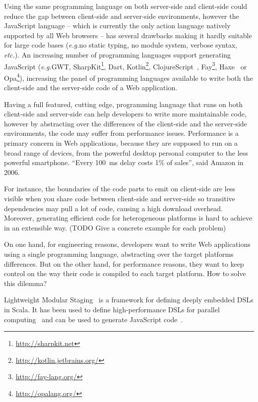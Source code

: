 \documentclass[preprint]{sigplanconf}
\newcommand{\eg}{\emph{e.g.}}
\newcommand{\etc}{\emph{etc.}}
\begin{document}
Using the same programming language on both server-side and client-side could reduce the gap between client-side and
server-side environments, however the JavaScript language -- which is currently the only action language natively
supported by all Web browsers -- has several drawbacks making it hardly suitable for large code bases (\eg no static
typing, no module system, verbose syntax, \etc). An increasing number of programming languages support generating
JavaScript (\eg GWT, SharpKit\footnote{\href{http://sharpkit.net}{http://sharpkit.net}}, Dart,
Kotlin\footnote{\href{http://kotlin.jetbrains.org/}{http://kotlin.jetbrains.org/}},
ClojureScript~\cite{McGranaghan11_ClojureScript}, Fay\footnote{\href{http://fay-lang.org/}{http://fay-lang.org/}},
Haxe~\cite{Cannasse08_HaXe} or Opa\footnote{\href{http://opalang.org/}{http://opalang.org/}}), increasing the panel
of programming languages available to write both the client-side and the server-side code of a Web application.

Having a full featured, cutting edge, programming language that runs on both client-side and server-side can help
developers to write more maintainable code, however by abstracting over the differences of the client-side and the
server-side environments, the code may suffer from performance issues. Performance is a primary concern in Web
applications, because they are supposed to run on a broad range of devices, from the powerful desktop personal
computer to the less powerful smartphone. “Every 100~ms delay costs 1\% of sales”, said Amazon in 2006.

For instance, the boundaries of the code parts to emit on client-side are less visible when you share code between
client-side and server-side so transitive dependencies may pull a lot of code, causing a high download overhead.
Moreover, generating efficient code for heterogeneous platforms is hard to achieve in an extensible way. (TODO Give a
concrete example for each problem)

On one hand, for engineering reasons, developers want to write Web applications using a single programming language,
abstracting over the target platforms differences. But on the other hand, for performance reasons, they want to keep
control on the way their code is compiled to each target platform. How to solve this dilemma?

Lightweight Modular Staging~\cite{Rompf12_LMSThesis} is a framework for defining deeply embedded DSLs in Scala. It
has been used to define high-performance DSLs for parallel computing~\cite{Brown11_Parallel} and can be used to
generate JavaScript code~\cite{Kossakowski12_JsDESL}.
\end{document}
